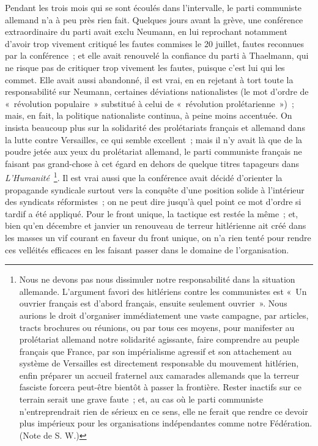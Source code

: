 \documentclass[french,twoside]{book} %
\begin{document}
Pendant les trois mois qui se sont écoulés dans l'intervalle, le parti communiste allemand n'a à peu près rien fait. Quelques jours avant la grève, une conférence extraordinaire du parti avait exclu Neumann, en lui reprochant notamment d'avoir trop vivement critiqué les fautes commises le 20 juillet, fautes reconnues par la conférence ; et elle avait renouvelé la confiance du parti à Thaelmann, qui ne risque pas de critiquer trop vivement les fautes, puisque c'est lui qui les commet. Elle avait aussi abandonné, il est vrai, en en rejetant à tort toute la responsabilité sur Neumann, certaines déviations natio­nalistes (le mot d'ordre de « révolution populaire » substitué à celui de « révolution prolétarienne ») ; mais, en fait, la politique nationaliste continua, à peine moins accentuée. On insista beaucoup plus sur la solidarité des prolétariats français et allemand dans la lutte contre Versailles, ce qui semble excellent ; mais il n'y avait là que de la poudre jetée aux yeux du prolétariat allemand, le parti communiste français ne faisant pas grand-chose à cet égard en dehors de quelque titres tapageurs dans {\itshape L'Humanité} \footnote{Nous ne devons pas nous dissimuler notre responsabilité dans la situation allemande. L'argument favori des hitlériens contre les communistes est « Un ouvrier français est d'abord français, ensuite seulement ouvrier ». Nous aurions le droit d'organiser immé­diatement une vaste campagne, par articles, tracts brochures ou réunions, ou par tous ces moyens, pour manifester au prolétariat allemand notre solidarité agissante, faire comprendre au peuple français que France, par son impérialisme agressif et son attache­ment au système de Versailles est directement responsable du mouvement hitlérien, enfin préparer un accueil fraternel aux camarades allemands que la terreur fasciste forcera peut-être bientôt à passer la frontière. Rester inactifs sur ce terrain serait une grave faute ; et, au cas où le parti communiste n'entreprendrait rien de sérieux en ce sens, elle ne ferait que rendre ce devoir plus impérieux pour les organisations indépendantes comme notre Fédération. (Note de S. W.)}. Il est vrai aussi que la conférence avait décidé d'orienter la propagande syndicale surtout vers la conquête d'une position solide à l'intérieur des syndicats réformistes ; on ne peut dire jusqu'à quel point ce mot d'ordre si tardif a été appliqué. Pour le front unique, la tactique est restée la même ; et, bien qu'en décembre et janvier un renouveau de terreur hitlérienne ait créé dans les masses un vif courant en faveur du front unique, on n'a rien tenté pour rendre ces velléités efficaces en les faisant passer dans le domaine de l'organisation.\par
\end{document}
